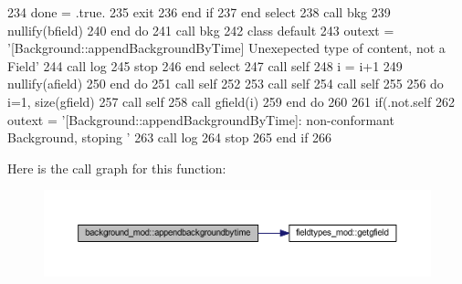 \begin{DoxyCode}
234                         done = .true.
235                         \textcolor{keywordflow}{exit}
236 \textcolor{keywordflow}{                    end if}
237 \textcolor{keywordflow}{                end select}
238                 \textcolor{keyword}{call }bkg%
239                 \textcolor{keyword}{nullify}(bfield)
240 \textcolor{keywordflow}{            end do}
241             \textcolor{keyword}{call }bkg%
242 \textcolor{keywordflow}{            class default}
243             outext = \textcolor{stringliteral}{'[Background::appendBackgroundByTime] Unexepected type of content, not a Field'}
244             \textcolor{keyword}{call }log%
245             stop
246 \textcolor{keywordflow}{        end select}
247         \textcolor{keyword}{call }self%
248         i = i+1
249         \textcolor{keyword}{nullify}(afield)
250 \textcolor{keywordflow}{    end do}
251     \textcolor{keyword}{call }self%
252 
253     \textcolor{keyword}{call }self%
254     \textcolor{keyword}{call }self%
255 
256     \textcolor{keywordflow}{do} i=1, \textcolor{keyword}{size}(gfield)
257         \textcolor{keyword}{call }self%
258         \textcolor{keyword}{call }gfield(i)%
259 \textcolor{keywordflow}{    end do}
260 
261     \textcolor{keywordflow}{if}(.not.self%
262         outext = \textcolor{stringliteral}{'[Background::appendBackgroundByTime]: non-conformant Background, stoping '}
263         \textcolor{keyword}{call }log%
264         stop
265 \textcolor{keywordflow}{    end if}
266 
\end{DoxyCode}
Here is the call graph for this function\+:\nopagebreak
\begin{figure}[H]
\begin{center}
\leavevmode
\includegraphics[width=350pt]{namespacebackground__mod_a02fa44cb4575159362bfa3b55520d387_cgraph}
\end{center}
\end{figure}
\mbox{\label{namespacebackground__mod_af2f517e4aa946491744e012153045bd4}} 
